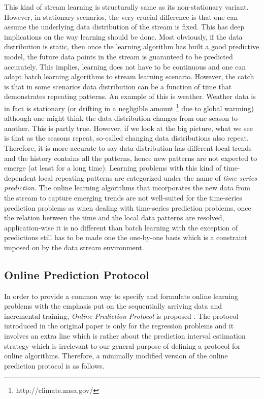 {This kind of stream learning is structurally same as its non-stationary variant. However, in stationary scenarios, the very crucial difference is that one can assume the underlying data distribution of the stream is fixed. This has deep implications on the way learning should be done. Most obviously, if the data distribution is static, then once the learning algorithm has built a good predictive model, the future data points in the stream is guaranteed to be predicted accurately. This implies, learning does not have to be continuous and one can adapt batch learning algorithms to stream learning scenario. However, the catch is that in some scenarios data distribution can be a function of time that demonstrates repeating patterns. An example of this is weather. Weather data is in fact is stationary (or drifting in a negligible amount \footnote{http://climate.nasa.gov/} due to global warming) although one might think the data distribution changes from one season to another. This is partly true. However, if we look at the big picture, what we see is that as the seasons repeat, so-called changing data distributions also repeat. Therefore, it is more accurate to say data distribution has different local trends and the history contains all the patterns, hence new patterns are not expected to emerge (at least for a long time). Learning problems with this kind of time-dependent local repeating patterns are categorized under the name of \textit{time-series prediction}. The online learning algorithms that incorporates the new data from the stream to capture emerging trends are not well-suited for the time-series prediction problems as when dealing with time-series prediction problems, once the relation between the time and the local data patterns are resolved, application-wise it is no different than batch learning with the exception of predictions still has to be made one the one-by-one basis which is a constraint imposed on by the data stream environment.

\subsection{Online Prediction Protocol}
In order to provide a common way to specify and formulate online learning problems with the emphasis put on the sequentially arriving data and incremental training, \textit{Online Prediction Protocol} is proposed \cite[p. 5]{vovk_-line_2009}. The protocol introduced in the original paper is only for the regression problems and it involves an extra line which is rather about the prediction interval estimation strategy which is irrelevant to our general purpose of defining a protocol for online algorithms. Therefore, a minimally modified version of the online prediction protocol is as follows.

}
